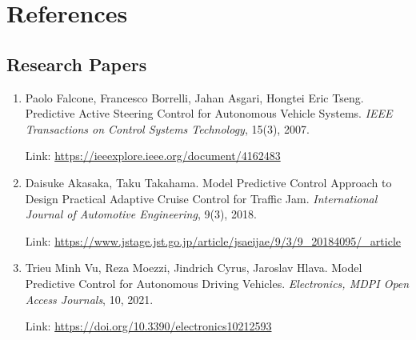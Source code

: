 \chapter{References}
\section{Research Papers}
\begin{enumerate}
    \item Paolo Falcone, Francesco Borrelli, Jahan Asgari, Hongtei Eric Tseng. Predictive Active Steering Control for Autonomous Vehicle Systems. \textit{IEEE Transactions on Control Systems Technology}, 15(3), 2007.

    Link: \href{https://ieeexplore.ieee.org/document/4162483}{https://ieeexplore.ieee.org/document/4162483}
    \item Daisuke Akasaka, Taku Takahama. Model Predictive Control Approach to Design Practical Adaptive Cruise Control for Traffic Jam. \textit{International Journal of Automotive Engineering}, 9(3), 2018. 

    Link: \href{https://www.jstage.jst.go.jp/article/jsaeijae/9/3/9_20184095/_article}{https://www.jstage.jst.go.jp/article/jsaeijae/9/3/9\_20184095/\_article}
    \item Trieu Minh Vu, Reza Moezzi, Jindrich Cyrus, Jaroslav Hlava. Model Predictive Control for Autonomous Driving Vehicles. \textit{Electronics, MDPI Open Access Journals}, 10, 2021. 

    Link: \href{https://doi.org/10.3390/electronics10212593}{https://doi.org/10.3390/electronics10212593}
\end{enumerate}

